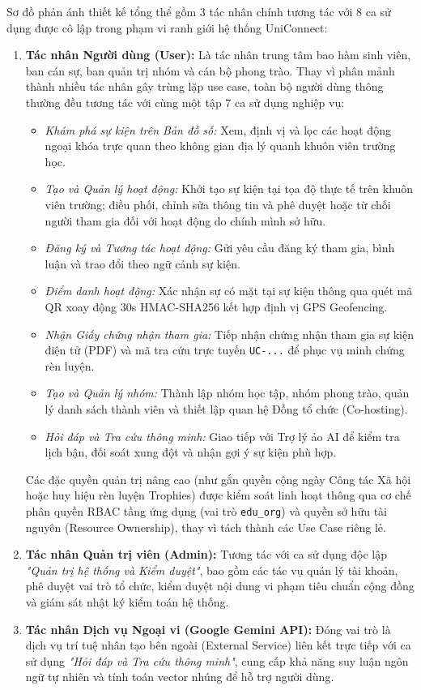 Sơ đồ phản ánh thiết kế tổng thể gồm 3 tác nhân chính tương tác với 8 ca sử dụng được cô lập trong phạm vi ranh giới hệ thống UniConnect:

\begin{enumerate}[label=\textbf{\arabic*.}]
    \item \textbf{Tác nhân Người dùng (User):} Là tác nhân trung tâm bao hàm sinh viên, ban cán sự, ban quản trị nhóm và cán bộ phong trào. Thay vì phân mảnh thành nhiều tác nhân gây trùng lặp use case, toàn bộ người dùng thông thường đều tương tác với cùng một tập 7 ca sử dụng nghiệp vụ:
    \begin{itemize}
        \item \textit{Khám phá sự kiện trên Bản đồ số:} Xem, định vị và lọc các hoạt động ngoại khóa trực quan theo không gian địa lý quanh khuôn viên trường học.
        \item \textit{Tạo và Quản lý hoạt động:} Khởi tạo sự kiện tại tọa độ thực tế trên khuôn viên trường; điều phối, chỉnh sửa thông tin và phê duyệt hoặc từ chối người tham gia đối với hoạt động do chính mình sở hữu.
        \item \textit{Đăng ký và Tương tác hoạt động:} Gửi yêu cầu đăng ký tham gia, bình luận và trao đổi theo ngữ cảnh sự kiện.
        \item \textit{Điểm danh hoạt động:} Xác nhận sự có mặt tại sự kiện thông qua quét mã QR xoay động 30s HMAC-SHA256 kết hợp định vị GPS Geofencing.
        \item \textit{Nhận Giấy chứng nhận tham gia:} Tiếp nhận chứng nhận tham gia sự kiện điện tử (PDF) và mã tra cứu trực tuyến \texttt{UC-...} để phục vụ minh chứng rèn luyện.
        \item \textit{Tạo và Quản lý nhóm:} Thành lập nhóm học tập, nhóm phong trào, quản lý danh sách thành viên và thiết lập quan hệ Đồng tổ chức (Co-hosting).
        \item \textit{Hỏi đáp và Tra cứu thông minh:} Giao tiếp với Trợ lý ảo AI để kiểm tra lịch bận, đối soát xung đột và nhận gợi ý sự kiện phù hợp.
    \end{itemize}
    Các đặc quyền quản trị nâng cao (như gắn quyền cộng ngày Công tác Xã hội hoặc huy hiệu rèn luyện Trophies) được kiểm soát linh hoạt thông qua cơ chế phân quyền RBAC tầng ứng dụng (vai trò \texttt{edu\_org}) và quyền sở hữu tài nguyên (Resource Ownership), thay vì tách thành các Use Case riêng lẻ.

    \item \textbf{Tác nhân Quản trị viên (Admin):} Tương tác với ca sử dụng độc lập \textit{"Quản trị hệ thống và Kiểm duyệt"}, bao gồm các tác vụ quản lý tài khoản, phê duyệt vai trò tổ chức, kiểm duyệt nội dung vi phạm tiêu chuẩn cộng đồng và giám sát nhật ký kiểm toán hệ thống.

    \item \textbf{Tác nhân Dịch vụ Ngoại vi (Google Gemini API):} Đóng vai trò là dịch vụ trí tuệ nhân tạo bên ngoài (External Service) liên kết trực tiếp với ca sử dụng \textit{"Hỏi đáp và Tra cứu thông minh"}, cung cấp khả năng suy luận ngôn ngữ tự nhiên và tính toán vector nhúng để hỗ trợ người dùng.
\end{enumerate}

